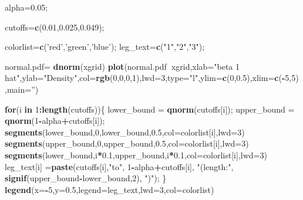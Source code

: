 \documentclass[12pt,]{book}
\newenvironment{Shaded}{\begin{snugshade}}{\end{snugshade}}
\newcommand{\KeywordTok}[1]{\textcolor[rgb]{0.13,0.29,0.53}{\textbf{#1}}}
\newcommand{\DataTypeTok}[1]{\textcolor[rgb]{0.13,0.29,0.53}{#1}}
\newcommand{\DecValTok}[1]{\textcolor[rgb]{0.00,0.00,0.81}{#1}}
\newcommand{\FloatTok}[1]{\textcolor[rgb]{0.00,0.00,0.81}{#1}}
\newcommand{\StringTok}[1]{\textcolor[rgb]{0.31,0.60,0.02}{#1}}
\newcommand{\ControlFlowTok}[1]{\textcolor[rgb]{0.13,0.29,0.53}{\textbf{#1}}}
\newcommand{\OperatorTok}[1]{\textcolor[rgb]{0.81,0.36,0.00}{\textbf{#1}}}
\newcommand{\NormalTok}[1]{#1}
\begin{document}
\begin{Shaded}
\begin{Highlighting}[]
\NormalTok{alpha=}\FloatTok{0.05}\NormalTok{;}

\NormalTok{cutoffs=}\KeywordTok{c}\NormalTok{(}\FloatTok{0.01}\NormalTok{,}\FloatTok{0.025}\NormalTok{,}\FloatTok{0.049}\NormalTok{);}

\NormalTok{colorlist=}\KeywordTok{c}\NormalTok{(}\StringTok{'red'}\NormalTok{,}\StringTok{'green'}\NormalTok{,}\StringTok{'blue'}\NormalTok{);}
\NormalTok{leg_text=}\KeywordTok{c}\NormalTok{(}\StringTok{"1"}\NormalTok{,}\StringTok{"2"}\NormalTok{,}\StringTok{"3"}\NormalTok{);}

\NormalTok{normal.pdf=}\StringTok{ }\KeywordTok{dnorm}\NormalTok{(xgrid)}
\KeywordTok{plot}\NormalTok{(normal.pdf}\OperatorTok{~}\NormalTok{xgrid,}\DataTypeTok{xlab=}\StringTok{"beta 1 hat"}\NormalTok{,}\DataTypeTok{ylab=}\StringTok{"Density"}\NormalTok{,}\DataTypeTok{col=}\KeywordTok{rgb}\NormalTok{(}\DecValTok{0}\NormalTok{,}\DecValTok{0}\NormalTok{,}\DecValTok{0}\NormalTok{,}\DecValTok{1}\NormalTok{),}\DataTypeTok{lwd=}\DecValTok{3}\NormalTok{,}\DataTypeTok{type=}\StringTok{"l"}\NormalTok{,}\DataTypeTok{ylim=}\KeywordTok{c}\NormalTok{(}\DecValTok{0}\NormalTok{,}\FloatTok{0.5}\NormalTok{),}\DataTypeTok{xlim=}\KeywordTok{c}\NormalTok{(}\OperatorTok{-}\DecValTok{5}\NormalTok{,}\DecValTok{5}\NormalTok{),}\DataTypeTok{main=}\StringTok{''}\NormalTok{)}

\ControlFlowTok{for}\NormalTok{(i }\ControlFlowTok{in} \DecValTok{1}\OperatorTok{:}\KeywordTok{length}\NormalTok{(cutoffs))\{}
\NormalTok{lower_bound =}\StringTok{ }\KeywordTok{qnorm}\NormalTok{(cutoffs[i]);}
\NormalTok{upper_bound =}\StringTok{ }\KeywordTok{qnorm}\NormalTok{(}\DecValTok{1}\OperatorTok{-}\NormalTok{alpha}\OperatorTok{+}\NormalTok{cutoffs[i]);}
\KeywordTok{segments}\NormalTok{(lower_bound,}\DecValTok{0}\NormalTok{,lower_bound,}\FloatTok{0.5}\NormalTok{,}\DataTypeTok{col=}\NormalTok{colorlist[i],}\DataTypeTok{lwd=}\DecValTok{3}\NormalTok{)}
\KeywordTok{segments}\NormalTok{(upper_bound,}\DecValTok{0}\NormalTok{,upper_bound,}\FloatTok{0.5}\NormalTok{,}\DataTypeTok{col=}\NormalTok{colorlist[i],}\DataTypeTok{lwd=}\DecValTok{3}\NormalTok{)}
\KeywordTok{segments}\NormalTok{(lower_bound,i}\OperatorTok{*}\FloatTok{0.1}\NormalTok{,upper_bound,i}\OperatorTok{*}\FloatTok{0.1}\NormalTok{,}\DataTypeTok{col=}\NormalTok{colorlist[i],}\DataTypeTok{lwd=}\DecValTok{3}\NormalTok{)}
\NormalTok{leg_text[i] =}\KeywordTok{paste}\NormalTok{(cutoffs[i],}\StringTok{"to"}\NormalTok{, }\DecValTok{1}\OperatorTok{-}\NormalTok{alpha}\OperatorTok{+}\NormalTok{cutoffs[i], }\StringTok{"(length:"}\NormalTok{, }\KeywordTok{signif}\NormalTok{(upper_bound}\OperatorTok{-}\NormalTok{lower_bound,}\DecValTok{2}\NormalTok{), }\StringTok{")"}\NormalTok{);}
\NormalTok{\}}
\KeywordTok{legend}\NormalTok{(}\DataTypeTok{x=}\OperatorTok{-}\DecValTok{5}\NormalTok{,}\DataTypeTok{y=}\FloatTok{0.5}\NormalTok{,}\DataTypeTok{legend=}\NormalTok{leg_text,}\DataTypeTok{lwd=}\DecValTok{3}\NormalTok{,}\DataTypeTok{col=}\NormalTok{colorlist)}
\end{Highlighting}
\end{Shaded}
\end{document}
